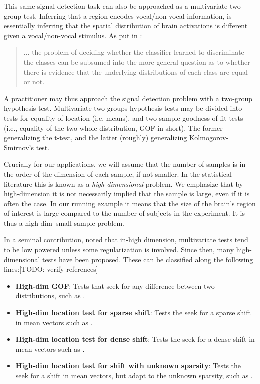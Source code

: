 \documentclass[journal]{IEEEtran}
\begin{document}
This same signal detection task can also be approached as a multivariate two-group test.
Inferring that a region encodes vocal/non-vocal information, is essentially inferring that the spatial distribution of brain activations is different given a vocal/non-vocal stimulus. 
As put in \cite{pereira_machine_2009}: 
\begin{quote}
	... the problem of deciding whether the classifier learned to discriminate the classes can be subsumed into the more general question as to whether there is evidence that the underlying distributions of each class are equal or not.
\end{quote}
A practitioner may thus approach the signal detection problem with a two-group hypothesis test.
Multivariate two-groups hypothesis-tests may be divided into tests for equality of location (i.e. means), and two-sample goodness of fit tests (i.e., equality of the two whole distribution, GOF in short).
The former generalizing the t-test, and the latter (roughly) generalizing Kolmogorov-Smirnov's test.


Crucially for our applications, we will assume that the number of samples is in the order of the dimension of each sample, if not smaller. 
In the statistical literature this is known as a \emph{high-dimensional} problem. 
We emphasize that by high-dimension it is not necessarily implied that the sample is large, even if it is often the case. 
In our running example it means that the size of the brain's region of interest is large compared to the number of subjects in the experiment. 
It is thus a high-dim--small-sample problem. 

In a seminal contribution, \cite{bai1996effect} noted that in-high dimension, multivariate tests tend to be low powered unless some regularization is involved. 
Since then, many high-dimensional tests have been proposed. 
These can be classified along the following lines:[TODO: verify references]
\begin{itemize}
	\item \textbf{High-dim GOF}: Tests that seek for any difference between two distributions, such as  \cite{hall2002permutation,szekely_brownian_2009,gretton_kernel_2012-1}.
	
	\item \textbf{High-dim location test for sparse shift}: Tests the seek for a sparse shift in mean vectors such as \cite{tony2014two,chang2014simulation}.
	
	\item \textbf{High-dim location test for dense shift}: Tests the seek for a dense shift in mean vectors such as  \cite{dempster1958high,bai1996effect,schafer_shrinkage_2005,goeman2006testing,srivastava_multivariate_2007,lopes2011more,nishiyama2013testing,thulin2014high,shen2015adaptive,xu2016adaptive,zhang2016high}.
	
	\item \textbf{High-dim location test for shift with unknown sparsity}: Tests the seek for a shift in mean vectors, but adapt to the unknown sparsity, such as \cite{donoho2004higher,zhong2013tests,moscovich2016exact}.
	
\end{itemize}
\end{document}
